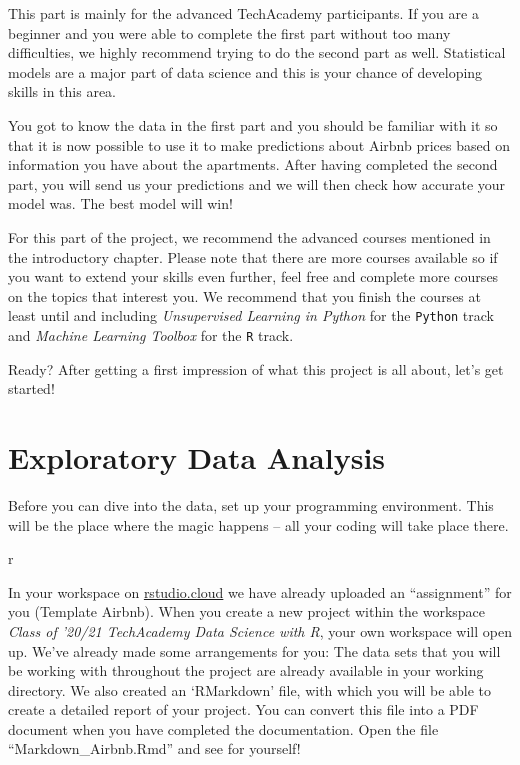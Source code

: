 \documentclass[
  11pt,
]{book}
\begin{document}
This part is mainly for the advanced TechAcademy participants. If you
are a beginner and you were able to complete the first part without too
many difficulties, we highly recommend trying to do the second part as
well. Statistical models are a major part of data science and this is
your chance of developing skills in this area.

You got to know the data in the first part and you should be familiar
with it so that it is now possible to use it to make predictions about
Airbnb prices based on information you have about the apartments. After
having completed the second part, you will send us your predictions and
we will then check how accurate your model was. The best model will win!

For this part of the project, we recommend the advanced courses
mentioned in the introductory chapter. Please note that there are more
courses available so if you want to extend your skills even further,
feel free and complete more courses on the topics that interest you. We
recommend that you finish the courses at least until and including
\emph{Unsupervised Learning in Python} for the \texttt{Python} track and
\emph{Machine Learning Toolbox} for the \texttt{R} track.

Ready? After getting a first impression of what this project is all
about, let's get started!

\newpage

\hypertarget{exploratory-data-analysis}{%
\chapter{Exploratory Data Analysis}\label{exploratory-data-analysis}}

Before you can dive into the data, set up your programming environment.
This will be the place where the magic happens -- all your coding will
take place there.

\begin{tips}r

In your workspace on
\href{https://rstudio.cloud/projects}{rstudio.cloud} we have already
uploaded an ``assignment'' for you (Template Airbnb). When you create a
new project within the workspace \emph{Class of '20/21 \textbar{}
TechAcademy \textbar{} Data Science with R}, your own workspace will
open up. We've already made some arrangements for you: The data sets
that you will be working with throughout the project are already
available in your working directory. We also created an `RMarkdown'
file, with which you will be able to create a detailed report of your
project. You can convert this file into a PDF document when you have
completed the documentation. Open the file ``Markdown\_Airbnb.Rmd'' and
see for yourself!

\end{tips}
\end{document}
